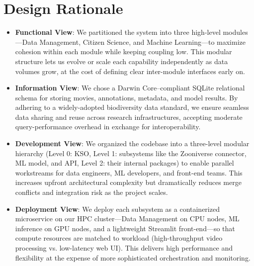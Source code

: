 \newpage
\section{Design Rationale}

\begin{itemize}
  \item \textbf{Functional View}: We partitioned the system into three high-level modules—Data Management, Citizen Science, and Machine Learning—to maximize cohesion within each module while keeping coupling low. This modular structure lets us evolve or scale each capability independently as data volumes grow, at the cost of defining clear inter-module interfaces early on.
  \item \textbf{Information View}: We chose a Darwin Core–compliant SQLite relational schema \cite{anton2021kso} for storing movies, annotations, metadata, and model results. By adhering to a widely-adopted biodiversity data standard, we ensure seamless data sharing and reuse across research infrastructures, accepting moderate query-performance overhead in exchange for interoperability.
  \item \textbf{Development View}: We organized the codebase into a three-level modular hierarchy (Level 0: KSO, Level 1: subsystems like the Zooniverse connector, ML model, and API, Level 2: their internal packages) to enable parallel workstreams for data engineers, ML developers, and front-end teams. This increases upfront architectural complexity but dramatically reduces merge conflicts and integration risk as the project scales.
  \item \textbf{Deployment View}: We deploy each subsystem as a containerized microservice on our HPC cluster—Data Management on CPU nodes, ML inference on GPU nodes, and a lightweight Streamlit front-end—so that compute resources are matched to workload (high-throughput video processing vs. low-latency web UI). This delivers high performance and flexibility at the expense of more sophisticated orchestration and monitoring.
\end{itemize}